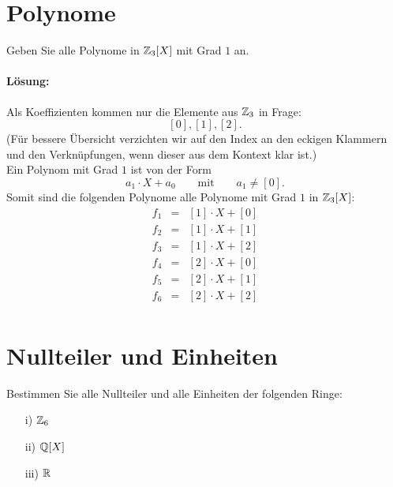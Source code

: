 \documentclass[
				a4paper,
				10pt
			]
			{scrartcl}
\begin{document}
\newpage
\section{Polynome}

Geben Sie alle Polynome in $\mathbb{Z}_3[X]$ mit Grad $1$ an. 

\paragraph{L\"osung:}

Als Koeffizienten kommen nur die Elemente aus $\mathbb{Z}_3$ in Frage:
$$
	[0], [1], [2].
$$
(F\"ur bessere \"Ubersicht verzichten wir auf den Index an den eckigen Klammern und den Verkn\"upfungen, wenn dieser aus dem Kontext klar ist.)\\

Ein Polynom mit Grad $1$ ist von der Form
$$
	a_1\cdot X + a_0	\qquad\text{mit}\qquad a_1\neq [0].
$$
Somit sind die folgenden Polynome alle Polynome mit Grad $1$ in $\mathbb{Z}_3[X]$:
\begin{eqnarray*}
	f_1	&=	& [1]\cdot X + [0]	\\
	f_2	&=	& [1]\cdot X + [1]	\\
	f_3	&=	& [1]\cdot X + [2]	\\
	f_4	&=	& [2]\cdot X + [0]	\\
	f_5	&=	& [2]\cdot X + [1]	\\
	f_6	&=	& [2]\cdot X + [2]	\\
\end{eqnarray*}

\section{Nullteiler und Einheiten}
Bestimmen Sie alle Nullteiler und alle Einheiten der folgenden Ringe:
\begin{itemize}
\item[i)] $\mathbb{Z}_6$
\item[ii)] $\mathbb{Q}[X]$
\item[iii)] $\mathbb{R}$
\end{itemize}
\end{document}
